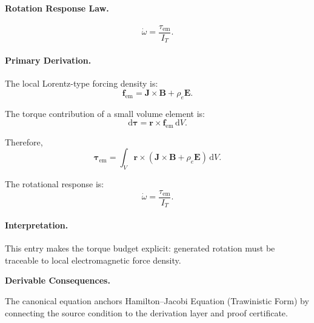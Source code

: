 \paragraph{Rotation Response Law.}
\begin{equation}
\dot{\omega}
=
\frac{\tau_{\mathrm{em}}}{I_T}.
\end{equation}

\paragraph{Primary Derivation.}
The local Lorentz-type forcing density is:
\begin{equation}
\mathbf{f}_{\mathrm{em}}
=
\mathbf{J}\times\mathbf{B}
+
\rho_e\mathbf{E}.
\end{equation}

The torque contribution of a small volume element is:
\begin{equation}
\mathrm{d}\boldsymbol{\tau}
=
\mathbf{r}\times\mathbf{f}_{\mathrm{em}}\,\mathrm{d}V .
\end{equation}

Therefore,
\begin{equation}
\boldsymbol{\tau}_{\mathrm{em}}
=
\int_V
\mathbf{r}\times
\left(
\mathbf{J}\times\mathbf{B}
+
\rho_e\mathbf{E}
\right)
\,\mathrm{d}V .
\end{equation}

The rotational response is:
\begin{equation}
\boxed{
\dot{\omega}
=
\frac{\tau_{\mathrm{em}}}{I_T}.
}
\end{equation}

\paragraph{Interpretation.}
This entry makes the torque budget explicit: generated rotation must be traceable to local electromagnetic force density.

\par\vspace{0.35em}
\noindent\textbf{Derivable Consequences.}\quad
\begingroup
\footnotesize
\raggedright
The canonical equation anchors Hamilton--Jacobi Equation (Trawinistic Form) by connecting the source condition to the derivation layer and proof certificate.
\par\endgroup

